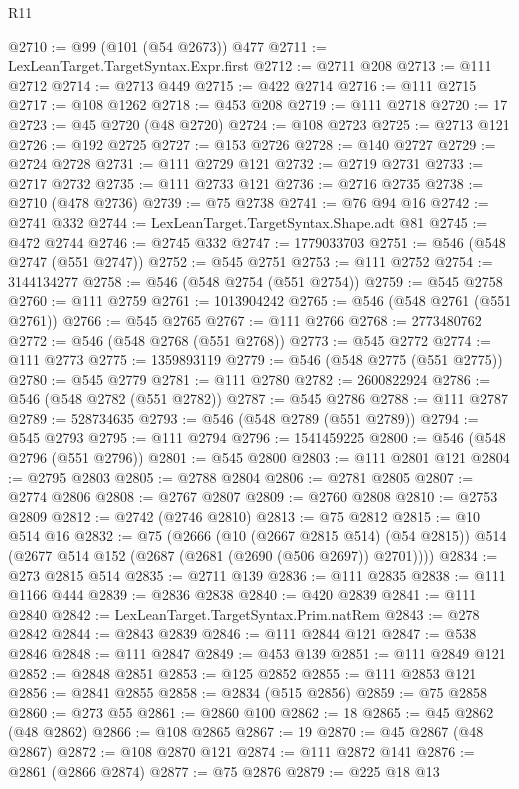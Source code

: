 \begin{lexlean}{R11}
\begin{coremodule}
{{{{{{{{{{{{{{{{{{{{{{{{{{{{{{{{{{{{{{{{{{{{{{{{{{{{{{{{{{{{{{{{{{{{{{{{{{{{{{{{{{@2710 := @99 (@101 (@54 @2673)) @477
@2711 := LexLeanTarget.TargetSyntax.Expr.first
@2712 := @2711 @208
@2713 := @111 @2712
@2714 := @2713 @449
@2715 := @422 @2714
@2716 := @111 @2715
@2717 := @108 @1262
@2718 := @453 @208
@2719 := @111 @2718
@2720 := 17
@2723 := @45 @2720 (@48 @2720)
@2724 := @108 @2723
@2725 := @2713 @121
@2726 := @192 @2725
@2727 := @153 @2726
@2728 := @140 @2727
@2729 := @2724 @2728
@2731 := @111 @2729 @121
@2732 := @2719 @2731
@2733 := @2717 @2732
@2735 := @111 @2733 @121
@2736 := @2716 @2735
@2738 := @2710 (@478 @2736)
@2739 := @75 @2738
@2741 := @76 @94 @16
@2742 := @2741 @332
@2744 := LexLeanTarget.TargetSyntax.Shape.adt @81
@2745 := @472 @2744
@2746 := @2745 @332
@2747 := 1779033703
@2751 := @546 (@548 @2747 (@551 @2747))
@2752 := @545 @2751
@2753 := @111 @2752
@2754 := 3144134277
@2758 := @546 (@548 @2754 (@551 @2754))
@2759 := @545 @2758
@2760 := @111 @2759
@2761 := 1013904242
@2765 := @546 (@548 @2761 (@551 @2761))
@2766 := @545 @2765
@2767 := @111 @2766
@2768 := 2773480762
@2772 := @546 (@548 @2768 (@551 @2768))
@2773 := @545 @2772
@2774 := @111 @2773
@2775 := 1359893119
@2779 := @546 (@548 @2775 (@551 @2775))
@2780 := @545 @2779
@2781 := @111 @2780
@2782 := 2600822924
@2786 := @546 (@548 @2782 (@551 @2782))
@2787 := @545 @2786
@2788 := @111 @2787
@2789 := 528734635
@2793 := @546 (@548 @2789 (@551 @2789))
@2794 := @545 @2793
@2795 := @111 @2794
@2796 := 1541459225
@2800 := @546 (@548 @2796 (@551 @2796))
@2801 := @545 @2800
@2803 := @111 @2801 @121
@2804 := @2795 @2803
@2805 := @2788 @2804
@2806 := @2781 @2805
@2807 := @2774 @2806
@2808 := @2767 @2807
@2809 := @2760 @2808
@2810 := @2753 @2809
@2812 := @2742 (@2746 @2810)
@2813 := @75 @2812
@2815 := @10 @514 @16
@2832 := @75
    (@2666
      (@10 (@2667 @2815 @514) (@54 @2815))
      @514
      (@2677 @514 @152 (@2687 (@2681 (@2690 (@506 @2697)) @2701))))
@2834 := @273 @2815 @514
@2835 := @2711 @139
@2836 := @111 @2835
@2838 := @111 @1166 @444
@2839 := @2836 @2838
@2840 := @420 @2839
@2841 := @111 @2840
@2842 := LexLeanTarget.TargetSyntax.Prim.natRem
@2843 := @278 @2842
@2844 := @2843 @2839
@2846 := @111 @2844 @121
@2847 := @538 @2846
@2848 := @111 @2847
@2849 := @453 @139
@2851 := @111 @2849 @121
@2852 := @2848 @2851
@2853 := @125 @2852
@2855 := @111 @2853 @121
@2856 := @2841 @2855
@2858 := @2834 (@515 @2856)
@2859 := @75 @2858
@2860 := @273 @55
@2861 := @2860 @100
@2862 := 18
@2865 := @45 @2862 (@48 @2862)
@2866 := @108 @2865
@2867 := 19
@2870 := @45 @2867 (@48 @2867)
@2872 := @108 @2870 @121
@2874 := @111 @2872 @141
@2876 := @2861 (@2866 @2874)
@2877 := @75 @2876
@2879 := @225 @18 @13
}}}}}}}}}}}}}}}}}}}}}}}}}}}}}}}}}}}}}}}}}}}}}}}}}}}}}}}}}}}}}}}}}}}}}}}}}}}}}}}}}}
\end{coremodule}
\end{lexlean}
